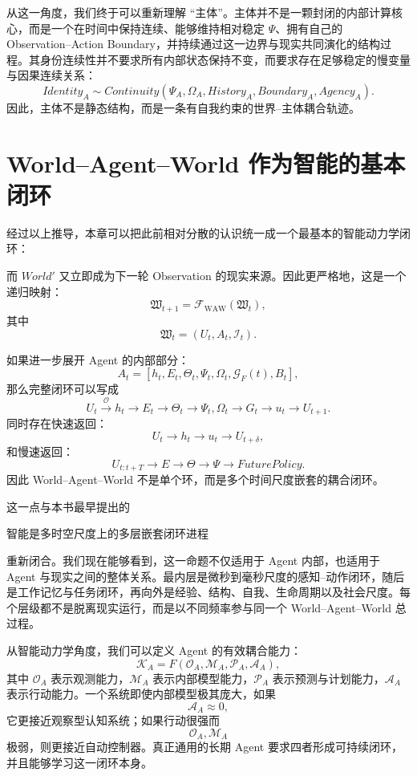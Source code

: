 从这一角度，我们终于可以重新理解 ``主体''。主体并不是一颗封闭的内部计算核心，而是一个在时间中保持连续、能够维持相对稳定 $\Psi$、拥有自己的 Observation--Action Boundary，并持续通过这一边界与现实共同演化的结构过程。其身份连续性并不要求所有内部状态保持不变，而要求存在足够稳定的慢变量与因果连续关系：
\[
Identity_A
\sim
Continuity
\left(
\Psi_A,
\Omega_A,
History_A,
Boundary_A,
Agency_A
\right).
\]
因此，主体不是静态结构，而是一条有自我约束的世界--主体耦合轨迹。


\section{World--Agent--World 作为智能的基本闭环}

经过以上推导，本章可以把此前相对分散的认识统一成一个最基本的智能动力学闭环：
\begin{statementbox}
\centering
{}
\end{statementbox}
而 $World'$ 又立即成为下一轮 Observation 的现实来源。因此更严格地，这是一个递归映射：
\[
\mathfrak W_{t+1}
=
\mathcal F_{\mathrm{WAW}}
\left(
\mathfrak W_t
\right),
\]
其中
\[
\mathfrak W_t
=
\left(
U_t,A_t,\mathcal I_t
\right).
\]

如果进一步展开 Agent 的内部部分：
\[
A_t
=
\left[
h_t,
E_t,
\Theta_t,
\Psi_t,
\Omega_t,
\mathcal G_F(t),
B_t
\right],
\]
那么完整闭环可以写成
\[
U_t
\xrightarrow{\mathcal O}
h_t
\xrightarrow{}
E_t
\xrightarrow{}
\Theta_t
\xrightarrow{}
\Psi_t,\Omega_t
\xrightarrow{}
G_t
\xrightarrow{}
u_t
\xrightarrow{}
U_{t+1}.
\]
同时存在快速返回：
\[
U_t
\rightarrow
h_t
\rightarrow
u_t
\rightarrow
U_{t+\delta},
\]
和慢速返回：
\[
U_{t:t+T}
\rightarrow
E
\rightarrow
\Theta
\rightarrow
\Psi
\rightarrow
FuturePolicy.
\]
因此 World--Agent--World 不是单个环，而是多个时间尺度嵌套的耦合闭环。

这一点与本书最早提出的
\begin{statementbox}
智能是多时空尺度上的多层嵌套闭环进程
\end{statementbox}
重新闭合。我们现在能够看到，这一命题不仅适用于 Agent 内部，也适用于 Agent 与现实之间的整体关系。最内层是微秒到毫秒尺度的感知--动作闭环，随后是工作记忆与任务闭环，再向外是经验、结构、自我、生命周期以及社会尺度。每个层级都不是脱离现实运行，而是以不同频率参与同一个 World--Agent--World 总过程。

从智能动力学角度，我们可以定义 Agent 的有效耦合能力：
\[
\mathcal K_A
=
F
\left(
\mathcal O_A,
\mathcal M_A,
\mathcal P_A,
\mathcal A_A
\right),
\]
其中 $\mathcal O_A$ 表示观测能力，$\mathcal M_A$ 表示内部模型能力，$\mathcal P_A$ 表示预测与计划能力，$\mathcal A_A$ 表示行动能力。一个系统即使内部模型极其庞大，如果
\[
\mathcal A_A\approx 0,
\]
它更接近观察型认知系统；如果行动很强而
\[
\mathcal O_A,\mathcal M_A
\]
极弱，则更接近自动控制器。真正通用的长期 Agent 要求四者形成可持续闭环，并且能够学习这一闭环本身。

